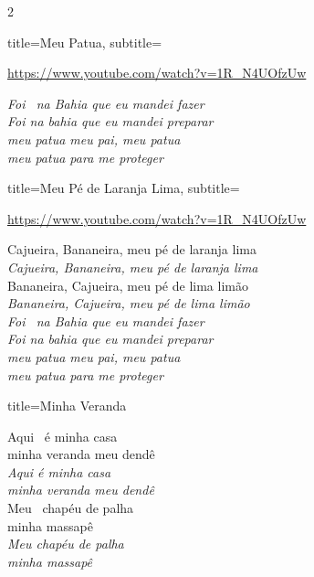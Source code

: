 \documentclass[fontsize=14pt, paper=a4, twoside, DIV=20]{scrreprt} %
\begin{document}
\begin{multicols*}{2}
\begin{song}{title={Meu Patua}, subtitle={\begin{small}
            \url{https://www.youtube.com/watch?v=1R_N4UOfzUw}
    \end{small}}

}
\begin{verse*}
            \textit{Foi \ na Bahia que eu mandei fazer\\
            Foi na bahia que eu mandei preparar\\
            meu patua meu pai, meu patua\\
            meu patua para me proteger\\}

                    \end{verse*}
\end{song}

\begin{song}{title={Meu Pé de Laranja Lima}, subtitle={\begin{small}
            \url{https://www.youtube.com/watch?v=1R_N4UOfzUw}
    \end{small}}

}
        \begin{verse*}
            Cajueira, Bananeira, meu pé de laranja lima\\
            \textit{Cajueira, Bananeira, meu pé de laranja lima}\\
            Bananeira, Cajueira, meu pé de lima limão\\
            \textit{Bananeira, Cajueira, meu pé de lima limão}\\

\textit{Foi \ na Bahia que eu mandei fazer\\
            Foi na bahia que eu mandei preparar\\
            meu patua meu pai, meu patua\\
        meu patua para me proteger\\}

                    \end{verse*}
\end{song}
\begin{song}{title={Minha Veranda}}
        \begin{verse*}
            Aqui \ é minha casa\\
            minha veranda meu dendê\\
            \textit{Aqui é minha casa}\\
            \textit{minha veranda meu dendê}\\

            Meu \ chapéu de palha\\
            minha massapê\\
            \textit{Meu chapéu de palha}\\
            \textit{minha massapê}\\


\end{verse*}
\end{song}
\end{multicols*}
\end{document}
